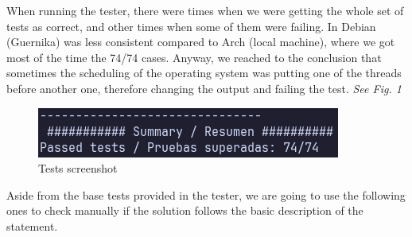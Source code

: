 \documentclass[es]{uc3mreport}
\begin{document}
\begin{report}
      \setcounter{subsection}{0}

      \setcounter{subsubsection}{0}

      When running the tester, there were times when we were getting the
      whole set of tests as correct, and other times when some of them
      were failing. In Debian (Guernika) was less consistent compared to
      Arch (local machine), where we got most of the time the 74/74
      cases. Anyway, we reached to the conclusion that sometimes the
      scheduling of the operating system was putting one of the threads
      before another one, therefore changing the output and failing the
      test. \emph{See Fig. 1}

      \begin{figure}
      \centering
      \includegraphics[scale=0.7]{img/tests.png}
      \caption{Tests screenshot}
      \end{figure}

      Aside from the base tests provided in the tester, we are going to
      use the following ones to check manually if the solution follows
      the basic description of the statement.


\end{report}
\end{document}
